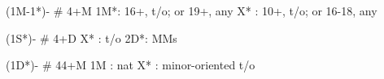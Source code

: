 (1M-1*)- # 4+M
1M*: 16+, t/o; or 19+, any
X* : 10+, t/o; or 16-18, any

(1S*)- # 4+D
X* : t/o
2D*: MMs

(1D*)- # 44+M
1M : nat
X* : minor-oriented t/o